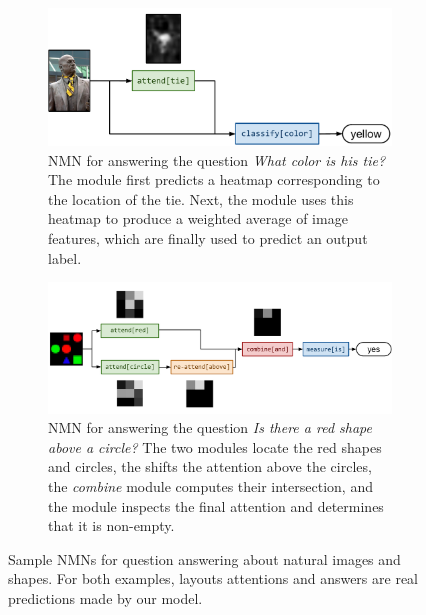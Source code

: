 \begin{figure}
  \begin{subfigure}[t]{0.4\textwidth}
    \includegraphics[width=\textwidth]{fig/full1}
    \caption{NMN for answering the question \emph{What color is
    his tie?} The  module first predicts a heatmap
    corresponding to the location of the tie. Next, the 
    module uses this heatmap to produce a weighted average of image features,
  which are finally used to predict an output label.}
  \end{subfigure}
  \hfill
  \begin{subfigure}[t]{0.55\textwidth}
    \includegraphics[width=\textwidth]{fig/full2}
    \caption{NMN for answering the question \emph{Is there a red shape above a
    circle?} The two  modules locate the red shapes and circles,
    the  shifts the attention above the circles, the
    \emph{combine} module computes their intersection, and the
     module inspects the final attention and determines
  that it is non-empty.}
  \end{subfigure}
  \caption{Sample NMNs for question answering about natural images and shapes.
  For both examples, layouts attentions and answers are real predictions made by
  our model.}
\end{figure}
